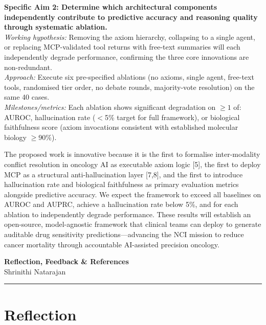 \documentclass[11pt, letterpaper]{article}
\begin{document}
\textbf{Specific Aim 2: Determine which architectural components independently contribute
to predictive accuracy and reasoning quality through systematic ablation.}\\
\textit{Working hypothesis:} Removing the axiom hierarchy, collapsing to a single agent, or
replacing MCP-validated tool returns with free-text summaries will each independently degrade
performance, confirming the three core innovations are non-redundant.\\
\textit{Approach:} Execute six pre-specified ablations (no axioms, single agent, free-text
tools, randomised tier order, no debate rounds, majority-vote resolution) on the same 40 cases.\\
\textit{Milestones/metrics:} Each ablation shows significant degradation on $\geq 1$ of:
AUROC, hallucination rate ($<$5\% target for full framework), or biological faithfulness
score (axiom invocations consistent with established molecular biology $\geq$90\%).

The proposed work is innovative because it is the first to formalise inter-modality conflict
resolution in oncology AI as executable axiom logic [5], the first to deploy MCP as a
structural anti-hallucination layer [7,8], and the first to introduce hallucination rate and
biological faithfulness as primary evaluation metrics alongside predictive accuracy.
We expect the framework to exceed all baselines on AUROC and AUPRC, achieve a hallucination
rate below 5\%, and for each ablation to independently degrade performance.
These results will establish an open-source, model-agnostic framework that clinical teams can
deploy to generate auditable drug sensitivity predictions---advancing the NCI mission to reduce
cancer mortality through accountable AI-assisted precision oncology.


\newpage

\begin{center}
    {\large\bfseries Reflection, Feedback \& References}\\[0.15em]
    {\small Shrinithi Natarajan}
\end{center}

\vspace{0.15em}
\hrule
\vspace{0.35em}

\section*{Reflection}
\end{document}
